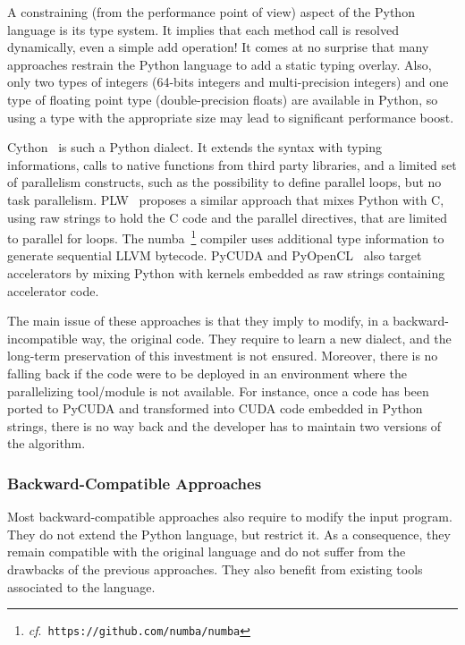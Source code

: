 \documentclass{sigplanconf}
\begin{document}
A constraining (from the performance point of view) aspect of the Python
language is its type system. It implies that each method call is resolved
dynamically, even a simple add operation! It comes at no surprise that many
approaches restrain the Python language to add a static typing overlay.  Also,
only two types of integers (64-bits integers and multi-precision integers) and
one type of floating point type (double-precision floats) are available in
Python, so using a type with the appropriate size may lead to significant
performance boost.

Cython~\cite{cython2010} is such a Python dialect. It extends the syntax with
typing informations, calls to native functions from third party libraries, and a
limited set of parallelism constructs, such as the possibility to define
parallel loops, but no task parallelism. PLW~\cite{dongara2007} proposes a
similar approach that mixes Python with C, using raw strings to hold the C code
and the parallel directives, that are limited to parallel for loops.  The
numba~\footnote{\emph{cf}.\ \texttt{https://github.com/numba/numba}} compiler
uses additional type information to generate sequential LLVM bytecode.  PyCUDA
and PyOpenCL~\cite{klockner2012} also target accelerators by mixing Python with
kernels embedded as raw strings containing accelerator code.

The main issue of these approaches is that they imply to modify, in a
backward-incompatible way, the original code. They require to learn a new
dialect, and the long-term preservation of this investment is not ensured.
Moreover, there is no falling back if the code were to be deployed in an
environment where the parallelizing tool/module is not available. For instance,
once a code has been ported to PyCUDA and transformed into CUDA code embedded in
Python strings, there is no way back and the developer has to maintain two
versions of the algorithm.

\subsubsection{Backward-Compatible Approaches}

Most backward-compatible approaches also require to modify the input program.
They do not extend the Python language, but restrict it. As a consequence, they
remain compatible with the original language and do not suffer from the
drawbacks of the previous approaches. They also benefit from existing tools
associated to the language.
\end{document}
